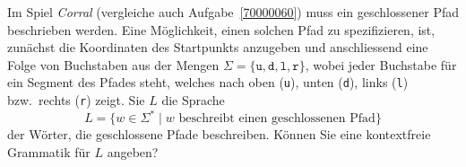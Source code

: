 Im Spiel {\em Corral} (vergleiche auch Aufgabe~\ref{70000060})
muss ein geschlossener Pfad beschrieben werden.
Eine Möglichkeit, einen solchen Pfad zu spezifizieren, ist, zunächst
die Koordinaten des Startpunkts anzugeben und anschliessend eine
Folge von Buchstaben aus der Mengen
$\Sigma=\{\texttt{u},\texttt{d},\texttt{l},\texttt{r}\}$,
wobei jeder Buchstabe für ein Segment des Pfades steht, welches 
nach oben (\texttt{u}),
unten (\texttt{d}),
links (\texttt{l})
bzw.~rechts (\texttt{r})
zeigt.
Sie $L$ die Sprache
\[
L
=
\{
w\in \Sigma^*
\;|\;
\text{$w$ beschreibt einen geschlossenen Pfad}
\}
\]
der Wörter, die geschlossene Pfade beschreiben.
Können Sie eine kontextfreie Grammatik für $L$ angeben?



